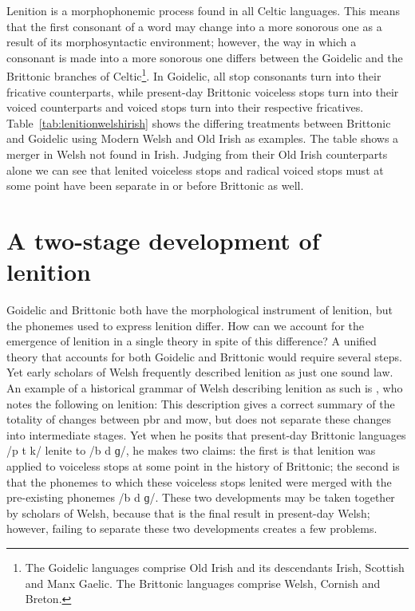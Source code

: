 Lenition is a morphophonemic process found in all Celtic languages. This means that the first consonant of a word may change into a more sonorous one as a result of its morphosyntactic environment; however, the way in which a consonant is made into a more sonorous one differs between the Goidelic and the Brittonic branches of Celtic\footnote{The Goidelic languages comprise Old Irish and its descendants Irish, Scottish and Manx Gaelic. The Brittonic languages comprise Welsh, Cornish and Breton.}. In Goidelic, all stop consonants turn into their fricative counterparts, while present-day Brittonic voiceless stops turn into their voiced counterparts and voiced stops turn into their respective fricatives. Table~\ref{tab:lenitionwelshirish} shows the differing treatments between Brittonic and Goidelic using Modern Welsh and Old Irish as examples. The table shows  a merger in Welsh not found in Irish. Judging from their Old Irish counterparts alone we can see that lenited voiceless stops  and radical voiced stops  must at some point have been separate in or before Brittonic as well.

\section{A two-stage development of lenition}
\label{sec:two-stage-devel}
Goidelic and Brittonic both have the morphological instrument of lenition, but the \gls{phoneme}s used to express lenition differ. How can we account for the emergence of lenition in a single theory in spite of this difference? A unified theory that accounts for both Goidelic and Brittonic would require several steps. Yet early scholars of Welsh  frequently described lenition as just one sound law. An example of a historical grammar of Welsh describing lenition as such is \textcite{Mor_Welsh13}, who notes the following on lenition:
This description gives a correct summary of the totality of changes between \gls{pbr} and \gls{mow}, but does not separate these changes  into intermediate stages. 
Yet when he posits that present-day Brittonic languages /p t k/ lenite to /b d ɡ/, he makes two claims: the first is that lenition was applied to voiceless stops at some point in the history of Brittonic; the second is that the \gls{phoneme}s to which these voiceless stops lenited were merged with the pre-existing \gls{phoneme}s /b d ɡ/. These two developments may be taken together by scholars of \eg Welsh, because that is the final result in present-day Welsh; however, failing to separate these two developments  creates a few problems.

